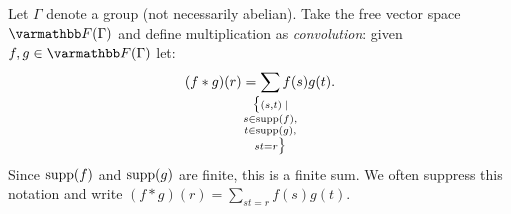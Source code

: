     \begin{example}
        Let $\Gamma$ denote a group (not necessarily abelian). Take the free vector space $\bfF(\Gamma)$ and define multiplication as \textit{convolution}: given $f,g \in \bfF(\Gamma)$ let:
            \begin{equation*}
            \begin{split}
                (f \ast g)(r) = \sum_{
                    \mathclap{\substack{\bigl\{ (s,t) \hspace{2pt} \mid \\ s \in \supp(f), \\ t \in \supp(g), \\ st = r \bigr\}}}} f(s)g(t).
            \end{split}
            \end{equation*}
        Since $\operatorname{supp}(f)$ and $\operatorname{supp}(g)$ are finite, this is a finite sum. We often suppress this notation and write $(f \ast g)(r) = \sum_{st = r}f(s)g(t)$.


\end{example}
